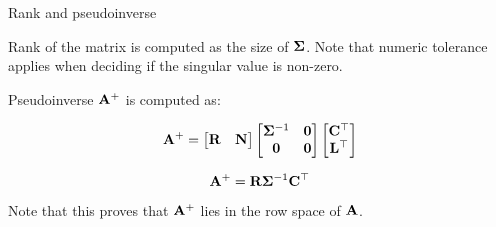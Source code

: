 \documentclass{beamer}
\begin{document}
\begin{frame}{Rank and pseudoinverse}
	\begin{flushleft}
		
		Rank of the matrix is computed as the size of $\mathbf{\Sigma}$. Note that numeric tolerance applies when deciding if the singular value is non-zero.
		
		\bigskip
		
		Pseudoinverse $\mathbf{A}^+$ is computed as:
		
		\begin{equation}
			\mathbf{A}^+ = 
			\begin{bmatrix}
				\mathbf{R} & \mathbf{N}
			\end{bmatrix}
			\begin{bmatrix}
				\mathbf{\Sigma}^{-1} & \mathbf{0} \\
				\mathbf{0} & \mathbf{0}
			\end{bmatrix}
			\begin{bmatrix}
				\mathbf{C}^\top \\ \mathbf{L}^\top
			\end{bmatrix}
		\end{equation}		
		
		\begin{equation}
			\mathbf{A}^+ = 
			\mathbf{R} \mathbf{\Sigma}^{-1} \mathbf{C}^\top
		\end{equation}		
	
	Note that this proves that $\mathbf{A}^+$ lies in the row space of $\mathbf{A}$.
		
	\end{flushleft}
\end{frame}
\end{document}
